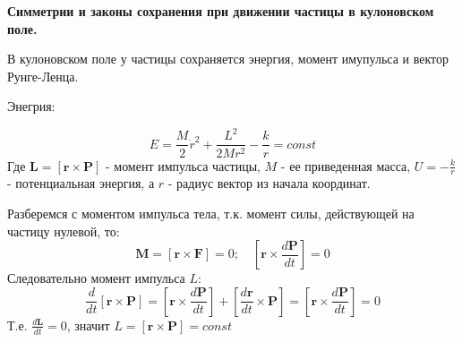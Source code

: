 \documentclass[a4paper,14pt]{article}
\begin{document}
\begin{center}
	\LARGE{\textbf{Симметрии и законы сохранения при движении частицы в кулоновском поле.}}\\
\end{center}

В кулоновском поле у частицы сохраняется энергия, момент имупульса и вектор Рунге-Ленца. 

Энегрия: 

\begin{equation*}
E = \frac{M}{2} \dot{r}^2 + \frac{L^2}{2Mr^2} - \frac{k}{r} = const
\end{equation*}
Где $\mathbf {L} = [\mathbf r \times \mathbf P ]$ - момент импульса частицы, $M$ - ее приведенная масса, $U = - \frac{k}{r}$ - потенциальная энергия, а $r$ - радиус вектор из начала координат. 

Разберемся с моментом импульса тела, т.к. момент силы, действующей на частицу нулевой, то:
\begin{equation*}
\mathbf {M} = [\mathbf r \times \mathbf F ] = 0 ; \quad  [\mathbf r \times \frac{d \mathbf P}{dt} ] = 0
\end{equation*}
Следовательно момент импульса $L$:
\begin{equation*}
\frac{d}{dt} [\mathbf r \times \mathbf P ] = [\mathbf r \times \frac{d \mathbf P}{dt} ] +  [\frac{d\mathbf r}{dt} \times \mathbf P] = [\mathbf r \times \frac{d \mathbf P}{dt} ] = 0
\end{equation*}
Т.е. $\frac{d\mathbf L}{dt} = 0$, значит $L = [\mathbf r \times \mathbf P ]= const$
\end{document}
